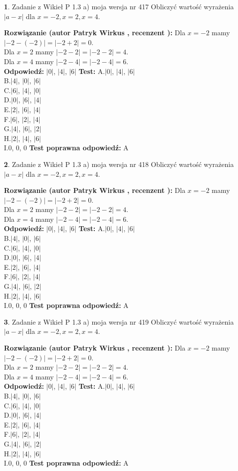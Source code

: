 \documentclass[12pt, a4paper]{article}
\theoremstyle{definition} %
\newtheorem{zad}{}
\newcommand{\zadStart}[1]{\begin{zad}#1\newline}
\newcommand{\zadStop}{\end{zad}}
\newcommand{\rozwStart}[2]{\noindent \textbf{Rozwiązanie (autor #1 , recenzent #2): }\newline}
\newcommand{\rozwStop}{\newline}
\newcommand{\odpStart}{\noindent \textbf{Odpowiedź:}\newline}
\newcommand{\odpStop}{\newline}
\newcommand{\testStart}{\noindent \textbf{Test:}\newline}
\newcommand{\testStop}{\newline}
\newcommand{\kluczStart}{\noindent \textbf{Test poprawna odpowiedź:}\newline}
\newcommand{\kluczStop}{\newline}
\begin{document}
\zadStart{Zadanie z Wikieł P 1.3 a) moja wersja nr 417}
Obliczyć wartość wyrażenia $|a - x|$ dla $x=-2,x=2,x=4$.
\zadStop
\rozwStart{Patryk Wirkus}{}
Dla $x = -2$ mamy $|-2 - (-2)| = |-2 + 2| = 0$.\\
Dla $x = 2$ mamy $|-2 - 2| = |-2 - 2| = 4$.\\
Dla $x = 4$ mamy $|-2 - 4| = |-2 - 4| = 6$.\\
\rozwStop
\odpStart
$|0|$, $|4|$, $|6|$
\odpStop
\testStart
A.$|0|$, $|4|$, $|6|$\\
B.$|4|$, $|0|$, $|6|$\\
C.$|6|$, $|4|$, $|0|$\\
D.$|0|$, $|6|$, $|4|$\\
E.$|2|$, $|6|$, $|4|$\\
F.$|6|$, $|2|$, $|4|$\\
G.$|4|$, $|6|$, $|2|$\\
H.$|2|$, $|4|$, $|6|$\\
I.$0$, $0$, $0$
\testStop
\kluczStart
A
\kluczStop



\zadStart{Zadanie z Wikieł P 1.3 a) moja wersja nr 418}
Obliczyć wartość wyrażenia $|a - x|$ dla $x=-2,x=2,x=4$.
\zadStop
\rozwStart{Patryk Wirkus}{}
Dla $x = -2$ mamy $|-2 - (-2)| = |-2 + 2| = 0$.\\
Dla $x = 2$ mamy $|-2 - 2| = |-2 - 2| = 4$.\\
Dla $x = 4$ mamy $|-2 - 4| = |-2 - 4| = 6$.\\
\rozwStop
\odpStart
$|0|$, $|4|$, $|6|$
\odpStop
\testStart
A.$|0|$, $|4|$, $|6|$\\
B.$|4|$, $|0|$, $|6|$\\
C.$|6|$, $|4|$, $|0|$\\
D.$|0|$, $|6|$, $|4|$\\
E.$|2|$, $|6|$, $|4|$\\
F.$|6|$, $|2|$, $|4|$\\
G.$|4|$, $|6|$, $|2|$\\
H.$|2|$, $|4|$, $|6|$\\
I.$0$, $0$, $0$
\testStop
\kluczStart
A
\kluczStop



\zadStart{Zadanie z Wikieł P 1.3 a) moja wersja nr 419}
Obliczyć wartość wyrażenia $|a - x|$ dla $x=-2,x=2,x=4$.
\zadStop
\rozwStart{Patryk Wirkus}{}
Dla $x = -2$ mamy $|-2 - (-2)| = |-2 + 2| = 0$.\\
Dla $x = 2$ mamy $|-2 - 2| = |-2 - 2| = 4$.\\
Dla $x = 4$ mamy $|-2 - 4| = |-2 - 4| = 6$.\\
\rozwStop
\odpStart
$|0|$, $|4|$, $|6|$
\odpStop
\testStart
A.$|0|$, $|4|$, $|6|$\\
B.$|4|$, $|0|$, $|6|$\\
C.$|6|$, $|4|$, $|0|$\\
D.$|0|$, $|6|$, $|4|$\\
E.$|2|$, $|6|$, $|4|$\\
F.$|6|$, $|2|$, $|4|$\\
G.$|4|$, $|6|$, $|2|$\\
H.$|2|$, $|4|$, $|6|$\\
I.$0$, $0$, $0$
\testStop
\kluczStart
A
\kluczStop
\end{document}
